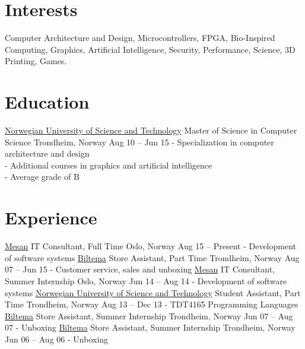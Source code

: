 \documentclass[print,a4paper]{friggeri-cv}
\begin{document}


\section{Interests}

Computer Architecture and Design,
Microcontrollers,
FPGA,
Bio-Inspired Computing,
Graphics,
Artificial Intelligence,
Security,
Performance,
Science,
3D Printing,
Games.

\vspace{2mm} %

\section{Education}

\begin{entrylist}
    \entryx
        {\href{http://ntnu.no/}{Norwegian University of Science and Technology}}
        {Master of Science in Computer Science}
        {Trondheim, Norway}
        {Aug 10 – Jun 15}
        {- Specialization in computer architecture and design\\
         - Additional courses in graphics and artificial intelligence\\
         - Average grade of B}
\end{entrylist}

\section{Experience}

\begin{entrylist}
    \entryx
        {\href{http://mesan.no/}{Mesan}}
        {IT Consultant, Full Time}
        {Oslo, Norway}
        {Aug 15 – Present}
        {- Development of software systems}
    \entryspace
    \entryx
        {\href{http://biltema.no/}{Biltema}}
        {Store Assistant, Part Time}
        {Trondheim, Norway}
        {Aug 07 – Jun 15}
        {- Customer service, sales and unboxing}
    \entryspace
    \entryx
        {\href{http://mesan.no/}{Mesan}}
        {IT Consultant, Summer Internship}
        {Oslo, Norway}
        {Jun 14 – Aug 14}
        {- Development of software systems}
    \entryspace
    \entryx
        {\href{http://ntnu.no/}{Norwegian University of Science and Technology}}
        {Student Assistant, Part Time}
        {Trondheim, Norway}
        {Aug 13 – Dec 13}
        {- TDT4165 Programming Languages}
    \entryspace
    \entryx
        {\href{http://biltema.no/}{Biltema}}
        {Store Assistant, Summer Internship}
        {Trondheim, Norway}
        {Jun 07 – Aug 07}
        {- Unboxing}
    \entryspace
    \entryx
        {\href{http://biltema.no/}{Biltema}}
        {Store Assistant, Summer Internship}
        {Trondheim, Norway}
        {Jun 06 – Aug 06}
        {- Unboxing}
\end{entrylist}
\end{document}
